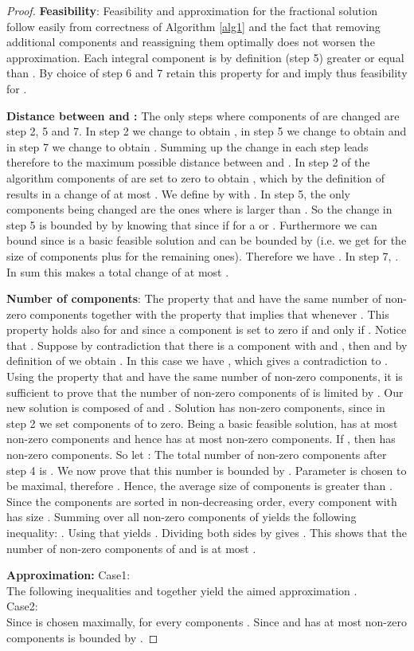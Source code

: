 \documentclass[a4paper,11pt]{article}
\begin{document}
\begin{proof}
	{\bf Feasibility}: Feasibility and approximation for the fractional solution  follow easily from correctness 
	of Algorithm \ref{alg1} and the fact that removing additional components  and reassigning them
	optimally does not worsen
	the approximation. Each integral component  is by definition (step 5) greater or equal than . 
	By choice of  step 6 and 7 retain this property for  and imply thus feasibility for .
	
	{\bf Distance between  and :}
	The only steps where components of  are changed are step 2, 5 and 7. In step 2 we change 
	 to obtain , in step 5 we change  to obtain  and in step 7
	we change  to obtain . Summing up the change in each step leads therefore to
	the maximum possible distance between  and . In step 2 of the algorithm  components
	of  are set to zero to obtain , which by the definition of  results in a change of at most .
	We define  by  
	 with .
	In step 5, the only components  being changed are the ones where  is larger than . 
	So the change in step 5 is bounded by  by
	knowing that  since  if  for a 
	or . Furthermore we can bound 
	 since 
	is a basic feasible solution and 
	can be bounded by  (i.e. we get  for the size of components 
	 plus 
	 for the
	remaining ones). Therefore we have .
 	In step 7, .
	In sum this makes a total change of at most .

	{\bf Number of components}: 
	The property that  and  have the same number of non-zero components together with the property that 
	 implies that  whenever .
	This property holds also for  and  since a component  is set to zero if and only if
	. Notice that .
	Suppose by contradiction that there is a component  with  and , then 
	and by definition
	of  we obtain . In this case we have , which gives a contradiction
	to .
	Using the property that  and  have the same number of non-zero components, it is sufficient to prove
	that the number of non-zero components of  is limited by .
	Our new solution  is composed of  and . Solution  has  non-zero
	components, since in step 2 we set  components of  to zero. Being a basic feasible solution,
	 has at most  non-zero components and hence  has at most  non-zero components.
	If , then  has  non-zero components.
	So let : The total number of non-zero components after step 4 is . We now prove that
	this number is bounded by . 
	Parameter  is chosen to be maximal, therefore . 
	Hence, the average size of
	components  is greater than . Since the components are sorted in non-decreasing order, 
	every component 
	with  has size .
	Summing over all non-zero components of  yields the following inequality:
	.
	Using that  yields
	.
	Dividing both sides by  gives . This shows
	that the number of non-zero components of  and  is at most .

	{\bf Approximation:} Case1: \\
	The following inequalities  and
	 together yield the aimed approximation
	.\\
	Case2: \\
	Since  is chosen maximally,  for every components . Since 
		and  has at most  non-zero
	components  is bounded by .
\end{proof}
\end{document}
